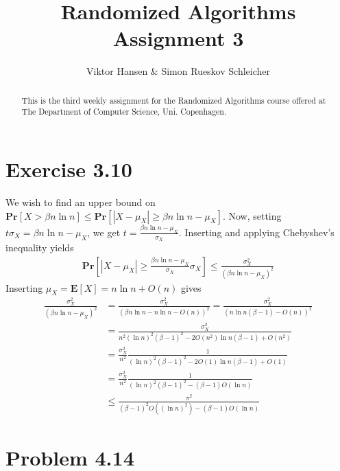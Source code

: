 \documentclass[12pt]{article}
\begin{document}
\nocite{*}


\title{Randomized Algorithms \\
       Assignment 3}

\author{Viktor Hansen \& Simon Rueskov Schleicher}

\maketitle

\begin{abstract}
  This is the third weekly assignment for the Randomized Algorithms course offered at The Department of Computer Science, Uni. Copenhagen.
\end{abstract}

\pagebreak

\section*{Exercise 3.10}
We wish to find an upper bound on $\mathbf{Pr} \left[ X > \beta n \ln n \right] \leq \mathbf{Pr} \left[ \left| X - \mu_X \right| \geq \beta n \ln n - \mu_X \right]$. Now, setting $t\sigma_X = \beta n \ln n - \mu_X$, we get $t = \frac{\beta n \ln n - \mu_X}{\sigma_X}$. Inserting and applying Chebyshev's inequality yields
\begin{align*}
\mathbf{Pr} \left[ \left| X - \mu_X \right| \geq \frac{\beta n \ln n - \mu_X}{\sigma_X} \sigma_X \right] \leq \frac{\sigma_X^2}{(\beta n \ln n - \mu_X)^2}
\end{align*}
Inserting $\mu_X = \mathbf{E} \left[ X \right] = n \ln n + O(n)$ gives
\begin{align*}
\frac{\sigma_X^2}{(\beta n \ln n - \mu_X)^2} &= \frac{\sigma_X^2}{(\beta n \ln n - n \ln n - O(n))^2} = \frac{\sigma_X^2}{(n \ln n(\beta - 1) - O(n))^2} \\
&= \frac{\sigma_X^2}{n^2 (\ln n)^2 (\beta - 1)^2 - 2 O(n^2) \ln n (\beta - 1) + O(n^2)} \\
&= \frac{\sigma_X^2}{n^2} \frac{1}{(\ln n)^2(\beta-1)^2-2O(1) \ln n (\beta-1) + O(1)} \\
&= \frac{\sigma_X^2}{n^2} \frac{1}{(\ln n)^2(\beta-1)^2-(\beta-1)O(\ln n)} \\
&\leq \frac{\pi^2}{(\beta-1)^2 O((\ln n)^2)-(\beta-1)O(\ln n)}
\end{align*}

\section*{Problem 4.14}
\end{document}
